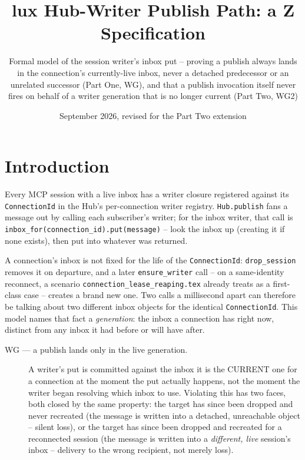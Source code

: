 \documentclass[a4paper,10pt,fleqn]{article}
\begin{document}
\title{lux Hub-Writer Publish Path: a Z Specification}
\author{Formal model of the session writer's inbox put -- proving a
  publish always lands in the connection's currently-live inbox, never a
  detached predecessor or an unrelated successor (Part One, WG), and that a
  publish invocation itself never fires on behalf of a writer generation
  that is no longer current (Part Two, WG2)}
\date{September 2026, revised for the Part Two extension}
\maketitle

\section{Introduction}

Every MCP session with a live inbox has a writer closure registered
against its \texttt{ConnectionId} in the Hub's per-connection writer
registry. \texttt{Hub.publish} fans a message out by calling each
subscriber's writer; for the inbox writer, that call is
\texttt{inbox\_for(connection\_id).put(message)} -- look the inbox up
(creating it if none exists), then put into whatever was returned.

A connection's inbox is not fixed for the life of the \texttt{ConnectionId}:
\texttt{drop\_session} removes it on departure, and a later
\texttt{ensure\_writer} call -- on a same-identity reconnect, a scenario
\texttt{connection\_lease\_reaping.tex} already treats as a first-class
case -- creates a brand new one. Two calls a millisecond apart can
therefore be talking about two different inbox objects for the identical
\texttt{ConnectionId}. This model names that fact a \emph{generation}: the
inbox a connection has right now, distinct from any inbox it had before or
will have after.

\begin{description}
  \item[WG --- a publish lands only in the live generation.] A writer's put
    is committed against the inbox it is the CURRENT one for a connection at
    the moment the put actually happens, not the moment the writer began
    resolving which inbox to use. Violating this has two faces, both closed
    by the same property: the target has since been dropped and never
    recreated (the message is written into a detached, unreachable object --
    silent loss), or the target has since been dropped and recreated for a
    reconnected session (the message is written into a \emph{different, live}
    session's inbox -- delivery to the wrong recipient, not merely loss).
\end{description}
\end{document}
